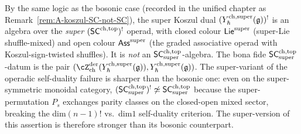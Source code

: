 \begin{remark}
\label{rem:super-koszul-SC-not-SC}
By the same logic as the bosonic case (recorded in the unified
chapter as Remark~\ref{rem:A-koszul-SC-not-SC}), the super Koszul dual
$(Y^{\mathrm{ch},\mathrm{super}}_{\hbar}(\mathfrak{g}))^{!}$ is an algebra over the \emph{super}
$(\mathsf{SC}^{\mathrm{ch},\mathrm{top}})^{!}$ operad, with closed colour $\mathsf{Lie}^{\mathrm{super}}$
(super-Lie shuffle-mixed) and open colour $\mathsf{Ass}^{\mathrm{super}}$ (the
graded associative operad with Koszul-sign-twisted shuffles). It is
\emph{not} an $\mathsf{SC}^{\mathrm{ch},\mathrm{top}}_{\mathrm{super}}$-algebra. The bona fide
$\mathsf{SC}^{\mathrm{ch},\mathrm{top}}_{\mathrm{super}}$-datum is the pair
$(\cZ^{\mathrm{der}}_{\mathrm{ch}}(\Ysuper_{\hbar}(\fg)),
\Ysuper_{\hbar}(\fg))$. The super-variant of the operadic
self-duality failure is sharper than the bosonic one: even on the
super-symmetric monoidal category, $(\mathsf{SC}^{\mathrm{ch},\mathrm{top}}_{\mathrm{super}})^{!}
\not\simeq \mathsf{SC}^{\mathrm{ch},\mathrm{top}}_{\mathrm{super}}$ because the super-permutation
$P_{s}$ exchanges parity classes on the closed-open mixed sector,
breaking the dim$(n-1)!$ vs.\ dim$1$ self-duality criterion. The
super-version of this assertion is therefore stronger than its bosonic
counterpart.
\end{remark}


